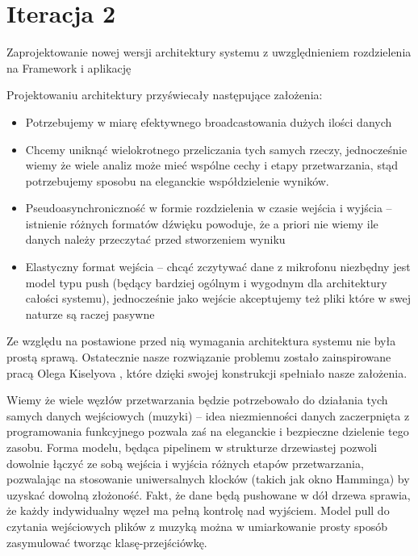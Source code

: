 \section{Iteracja 2}
\begin{Note}


Zaprojektowanie nowej wersji architektury systemu z uwzględnieniem rozdzielenia na Framework i aplikację


Projektowaniu architektury przyświecały następujące założenia:
\begin{itemize}

    \item Potrzebujemy w miarę efektywnego broadcastowania dużych ilości danych
    \item Chcemy uniknąć wielokrotnego przeliczania tych samych rzeczy, jednocześnie wiemy że wiele analiz może mieć wspólne cechy i etapy przetwarzania, stąd potrzebujemy sposobu na eleganckie współdzielenie wyników.
    \item Pseudoasynchroniczność w formie rozdzielenia w czasie wejścia i wyjścia -- istnienie różnych formatów dźwięku powoduje, że a priori nie wiemy ile danych należy przeczytać przed stworzeniem wyniku
    \item Elastyczny format wejścia -- chcąć zczytywać dane z mikrofonu niezbędny jest model typu push (będący bardziej ogólnym i wygodnym dla architektury całości systemu), jednocześnie jako wejście akceptujemy też pliki które w swej naturze są raczej pasywne

\end{itemize}

Ze względu na postawione przed nią wymagania architektura systemu nie była prostą sprawą.
Ostatecznie nasze rozwiązanie problemu zostało zainspirowane pracą Olega Kiselyova \cite{kiselyov}, które dzięki swojej konstrukcji spełniało nasze założenia.

Wiemy że wiele węzłów przetwarzania będzie potrzebowało do działania tych samych danych wejściowych
(muzyki) -- idea niezmienności danych zaczerpnięta z programowania funkcyjnego pozwala zaś na eleganckie i bezpieczne dzielenie tego zasobu. Forma modelu, będąca pipelinem w strukturze drzewiastej pozwoli dowolnie łączyć ze sobą wejścia i wyjścia różnych etapów przetwarzania, pozwalając na stosowanie uniwersalnych klocków (takich jak okno Hamminga) by uzyskać dowolną złożoność. Fakt, że dane będą pushowane w dół drzewa sprawia, że każdy indywidualny węzeł ma pełną kontrolę nad wyjściem. Model pull do czytania wejściowych plików z muzyką można w umiarkowanie prosty sposób zasymulować tworząc klasę-przejściówkę.


\end{Note}
